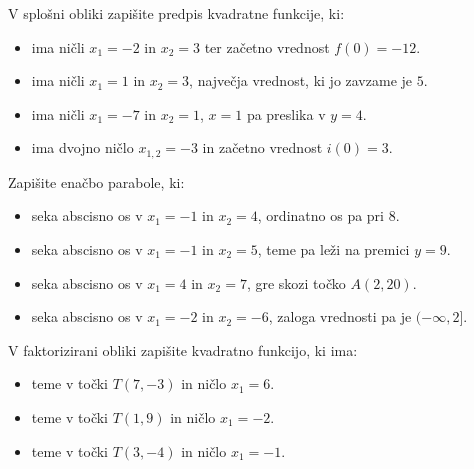     


    

            \begin{naloga}
                V splošni obliki zapišite predpis kvadratne funkcije, ki:
                                
                    \begin{itemize}
                        \item ima ničli $x_1=-2$ in $x_2=3$ ter začetno vrednost $f(0)=-12$.
                        \item ima ničli $x_1=1$ in $x_2=3$, največja vrednost, ki jo zavzame je $5$.
                        \item ima ničli $x_1=-7$ in $x_2=1$, $x=1$ pa preslika v $y=4$.
                        \item ima dvojno ničlo $x_{1,2}=-3$ in začetno vrednost $i(0)=3$.

                    \end{itemize}

            \end{naloga}


            \begin{naloga}
                Zapišite enačbo parabole, ki:
                
                    \begin{itemize}
                        \item seka abscisno os v $x_1=-1$ in $x_2=4$, ordinatno os pa pri $8$.
                        \item seka abscisno os v $x_1=-1$ in $x_2=5$, teme pa leži na premici $y=9$.
                        \item seka abscisno os v $x_1=4$ in $x_2=7$, gre skozi točko $A(2,20)$.
                        \item seka abscisno os v $x_1=-2$ in $x_2=-6$, zaloga vrednosti pa je $(-\infty,2]$.
                    \end{itemize}

            \end{naloga}

    


    

            \begin{naloga}
                V faktorizirani obliki zapišite kvadratno funkcijo, ki ima:
                                
                    \begin{itemize}
                        \item teme v točki $T(7,-3)$ in ničlo $x_1=6$.
                        \item teme v točki $T(1,9)$ in ničlo $x_1=-2$.
                        \item teme v točki $T(3,-4)$ in ničlo $x_1=-1$.

                    \end{itemize}

            \end{naloga}


